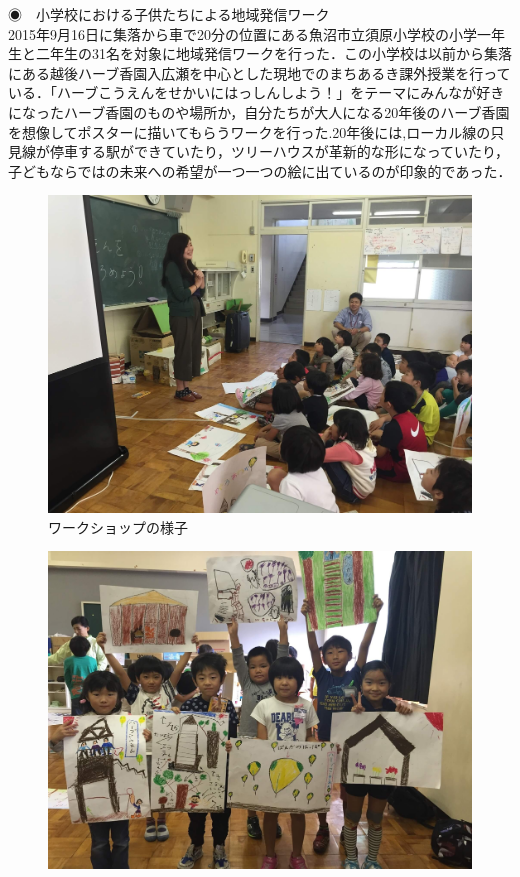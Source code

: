 \documentclass[a4paper]{jsarticle}
\begin{document}
\begin{itemize}
\subsubsubsection ◉　小学校における子供たちによる地域発信ワーク\\
2015年9月16日に集落から車で20分の位置にある魚沼市立須原小学校の小学一年生と二年生の31名を対象に地域発信ワークを行った．この小学校は以前から集落にある越後ハーブ香園入広瀬を中心とした現地でのまちあるき課外授業を行っている．「ハーブこうえんをせかいにはっしんしよう！」をテーマにみんなが好きになったハーブ香園のものや場所か，自分たちが大人になる20年後のハーブ香園を想像してポスターに描いてもらうワークを行った.20年後には,ローカル線の只見線が停車する駅ができていたり，ツリーハウスが革新的な形になっていたり，子どもならではの未来への希望が一つ一つの絵に出ているのが印象的であった．

\begin{figure}[H]
  \begin{center}
    \includegraphics[width=0.8\hsize]{./images/06.jpg}
    \caption{ワークショップの様子}
    \label{fig:tmu_hino}
  \end{center}
\end{figure}
\begin{figure}[H]
  \begin{center}
    \includegraphics[width=0.8\hsize]{./images/07.jpg}

\end{center}
\end{figure}
\end{itemize}
\end{document}
